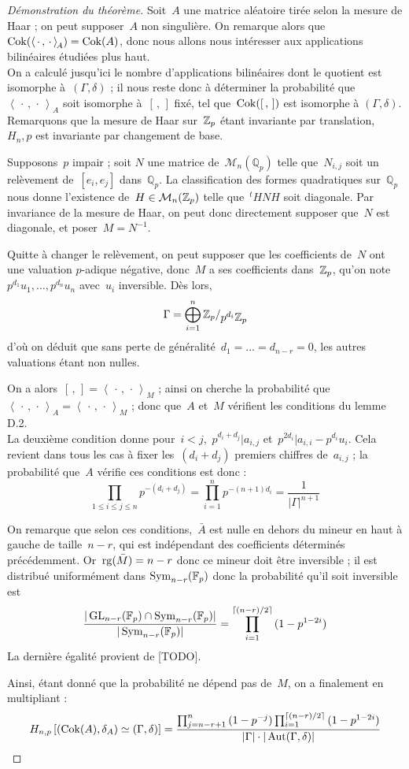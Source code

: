 \begin{proof}[Démonstration du théorème]
Soit~$A$ une matrice aléatoire tirée selon la mesure de Haar ; on peut supposer~$A$ non singulière. On remarque alors que~$\operatorname{Cok}(\left<\,\cdot\,,\,\cdot\,\right>_{\!A}) = \operatorname{Cok}(A)$, donc nous allons nous intéresser aux applications bilinéaires étudiées plus haut.\\
On a calculé jusqu'ici le nombre d'applications bilinéaires dont le quotient est isomorphe à~$(\Gamma, \delta)$ ; il nous reste donc à déterminer la probabilité que $\left<\,\cdot\,,\,\cdot\,\right>_{\!A}$ soit isomorphe à~$[\,,\,]$ fixé, tel que~$\operatorname{Cok}([\,,\,])$ est isomorphe à $(\Gamma,\delta)$. Remarquons que la mesure de Haar sur~$\mathbb{Z}_p$ étant invariante par translation,~$H_n,p$ est invariante par changement de base.

Supposons~$p$ impair ; soit $N$ une matrice de~$\mathcal{M}_n(\mathbb Q_p)$ telle que~$N_{i,j}$ soit un relèvement de~$[e_i, e_j]$ dans~$\mathbb Q_p$. La classification des formes quadratiques sur~$\mathbb{Q}_p$ nous donne l'existence de~$H\in\mathcal M_n(\mathbb{Z}_p)$ telle que~${}^tHNH$ soit diagonale. Par invariance de la mesure de Haar, on peut donc directement supposer que~$N$ est diagonale, et poser~$M = N^{-1}$.

Quitte à changer le relèvement, on peut supposer que les coefficients de~$N$ ont une valuation $p$-adique négative, donc~$M$ a ses coefficients dans~$\mathbb{Z}_p$, qu'on note~$p^{d_1}u_1, \dots, p^{d_n}u_n$ avec~$u_i$ inversible. Dès lors,
\[ \Gamma = \bigoplus_{i=1}^{n}\quotient{\Zp}{p^{d_i}\Zp} \]
d'où on déduit que sans perte de généralité~$d_1=\dots=d_{n-r}=0$, les autres valuations étant non nulles.

On a alors~$[\,,\,] = \left<\,\cdot\,,\,\cdot\,\right>_{\!M}$ ; ainsi on cherche la probabilité que~$\left<\,\cdot\,,\,\cdot\,\right>_{\!A}=\left<\,\cdot\,,\,\cdot\,\right>_{\!M}$ ; donc que~$A$ et~$M$ vérifient les conditions du lemme D.2.\\
La deuxième condition donne pour~$i<j$,~$p^{d_i+d_j} | a_{i,j}$ et~$p^{2d_i} | a_{i,i}-p^{d_i}u_i$. Cela revient dans tous les cas à fixer les~$(d_i+d_j)$ premiers chiffres de~$a_{i,j}$ ; la probabilité que~$A$ vérifie ces conditions est donc :
\[ \prod_{1\leq i\leq j\leq n}p^{-(d_i+d_j)} = \prod_{i=1}^{n}p^{-(n+1)d_i} = \frac1{|\Gamma|^{n+1}}\]

On remarque que selon ces conditions,~$\bar A$ est nulle en dehors du mineur en haut à gauche de taille~$n-r$, qui est indépendant des coefficients déterminés précédemment. Or~$\operatorname{rg}(\bar M) = n-r$ donc ce mineur doit être inversible ; il est distribué uniformément dans $\operatorname{Sym}_{n-r}(\mathbb F_p)$ donc la probabilité qu'il soit inversible est
\[ \frac{|\operatorname{GL}_{n-r}(\mathbb F_p)\cap \operatorname{Sym}_{n-r}(\mathbb F_p)|}{|\operatorname{Sym}_{n-r}(\mathbb F_p)|}= \prod_{i=1}^{\lceil (n-r)/2\rceil}{(1-p^{1-2i})} \]
La dernière égalité provient de [TODO].

Ainsi, étant donné que la probabilité ne dépend pas de~$M$, on a finalement en multipliant :
\[ H_{n,p}\left[(\operatorname{Cok}(A),\delta_A) \simeq (\Gamma,\delta)\right] = \frac{\prod_{j=n-r+1}^{n}{(1-p^{-j})}\prod_{i=1}^{\lceil (n-r)/2\rceil}{(1-p^{1-2i})}}{|\Gamma|\cdot|\operatorname{Aut}(\Gamma,\delta)|} \]
\end{proof}